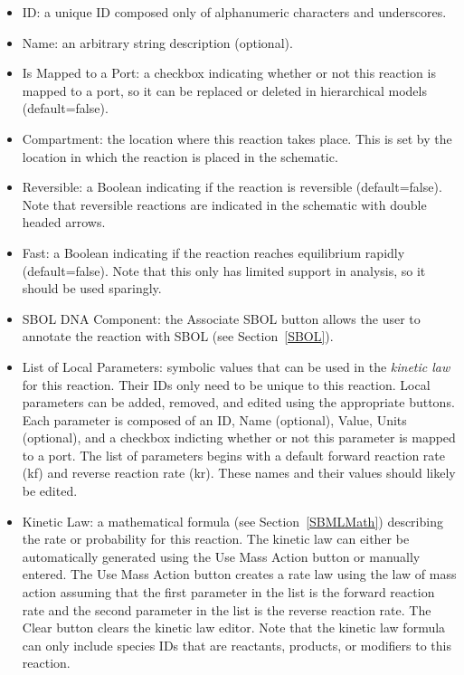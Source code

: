 \documentclass[titlepage,11pt]{article}
\begin{document}
\begin{itemize}
\item ID: a unique ID composed only of alphanumeric characters and underscores.
\item Name: an arbitrary string description (optional).
\item Is Mapped to a Port: a checkbox indicating whether or not this reaction is mapped to a port, so it can be replaced or deleted in hierarchical models (default=false).
\item Compartment: the location where this reaction takes place.  This is set by the location in which the reaction is placed in the schematic.
\item Reversible: a Boolean indicating if the reaction is reversible (default=false).  Note that reversible reactions are indicated in the schematic with double headed arrows.
\item Fast: a Boolean indicating if the reaction reaches equilibrium rapidly (default=false).  Note that this only has limited support in analysis, so it should be used sparingly.
\item SBOL DNA Component: the Associate SBOL button allows the user to annotate the reaction with SBOL (see Section~\ref{SBOL}).
\item List of Local Parameters: symbolic values that can be used in the \emph{kinetic law} for this reaction.  Their IDs only need to be unique to this reaction.  Local parameters can be added, removed, and edited using the appropriate buttons.  Each parameter is composed of an ID, Name (optional), Value, Units (optional), and a checkbox indicting whether or not this parameter is mapped to a port.  The list of parameters begins with a default forward reaction rate (kf) and reverse reaction rate (kr).  These names and their values should likely be edited. 
\item Kinetic Law: a mathematical formula (see Section~\ref{SBMLMath}) describing the rate or probability for this reaction.  The kinetic law can either be automatically generated using the Use Mass Action button or manually entered.  The Use Mass Action button creates a rate law using the law of mass action assuming that the first parameter in the list is the forward reaction rate and the second parameter in the list is the reverse reaction rate.  
The Clear button clears the kinetic law editor.  Note that the kinetic law formula can only include species IDs that are reactants, products, or modifiers to this reaction.
\end{itemize}
\end{document}
